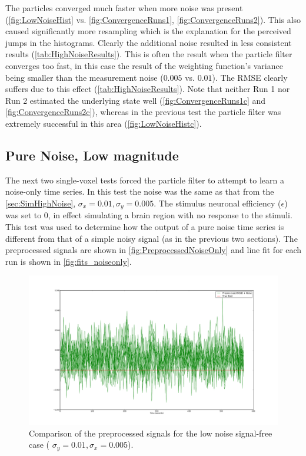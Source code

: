 The particles converged much faster when more noise was present (\autoref{fig:LowNoiseHist} vs.
\autoref{fig:ConvergenceRuns1}, \autoref{fig:ConvergenceRuns2}).
This also caused significantly more resampling which
is the explanation for the perceived jumps in the histograms.
Clearly the additional noise resulted in less consistent results 
(\autoref{tab:HighNoiseResults}).
This is often the
result when the particle filter converges too fast, in this case the result of the
weighting function's variance being smaller than the measurement noise ($0.005$ vs. $0.01$).
The \ac{RMSE} clearly suffers due to this effect (\autoref{tab:HighNoiseResults}).
Note that neither Run 1 nor Run 2 estimated the underlying state well (\autoref{fig:ConvergenceRuns1c}
and \autoref{fig:ConvergenceRuns2c}), whereas
in the previous test the particle filter was extremely successful in this area (\autoref{fig:LowNoiseHistc}).

\subsection{Pure Noise, Low magnitude}
\label{sec:PureNoiseLowMag}
The next two single-voxel tests forced the particle filter to attempt to learn a noise-only
time series. In this test the noise was the same as that from the \autoref{sec:SimHighNoise},
$\sigma_x = 0.01, \sigma_y = 0.005$. The stimulus neuronal efficiency ($\epsilon$) was set
to 0, in effect simulating a brain region with no response to the stimuli.
This test was used to determine how the output of a pure noise time series
is different from that of a simple noisy signal (as in the previous two sections).
The preprocessed signals are shown in \autoref{fig:PreprocessedNoiseOnly}
and line fit for each run is shown in \autoref{fig:fits_noiseonly}.


\begin{figure}[H]
\centering
\includegraphics[clip=true,trim=6cm 2cm 6cm 3.5cm,width=15cm]{images/preprocessed_noiseonly}
\caption{Comparison of the preprocessed signals for the low noise signal-free case (
$\sigma_y = 0.01, \sigma_x = 0.005$).}
\label{fig:PreprocessedNoiseOnly}
\end{figure}


